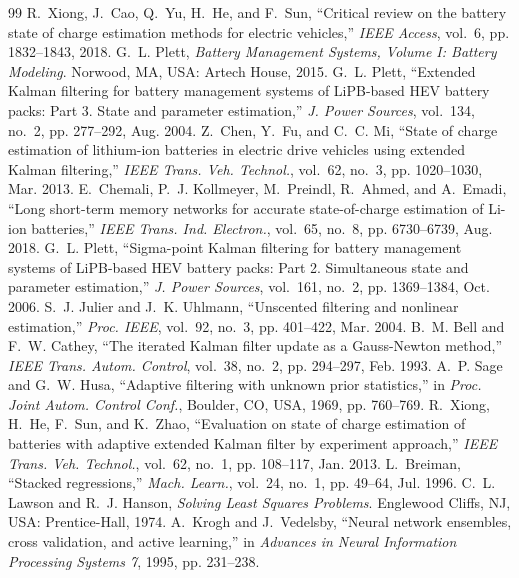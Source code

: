 \documentclass[journal]{IEEEtran}
\begin{document}
\begin{thebibliography}{99}
 R.~Xiong, J.~Cao, Q.~Yu, H.~He, and F.~Sun, ``Critical review on the battery state of charge estimation methods for electric vehicles,'' \emph{IEEE Access}, vol.~6, pp. 1832--1843, 2018.
 G.~L. Plett, \emph{Battery Management Systems, Volume I: Battery Modeling}. Norwood, MA, USA: Artech House, 2015.
 G.~L. Plett, ``Extended Kalman filtering for battery management systems of LiPB-based HEV battery packs: Part 3. State and parameter estimation,'' \emph{J. Power Sources}, vol.~134, no.~2, pp. 277--292, Aug. 2004.
 Z.~Chen, Y.~Fu, and C.~C. Mi, ``State of charge estimation of lithium-ion batteries in electric drive vehicles using extended Kalman filtering,'' \emph{IEEE Trans. Veh. Technol.}, vol.~62, no.~3, pp. 1020--1030, Mar. 2013.
 E.~Chemali, P.~J. Kollmeyer, M.~Preindl, R.~Ahmed, and A.~Emadi, ``Long short-term memory networks for accurate state-of-charge estimation of Li-ion batteries,'' \emph{IEEE Trans. Ind. Electron.}, vol.~65, no.~8, pp. 6730--6739, Aug. 2018.
 G.~L. Plett, ``Sigma-point Kalman filtering for battery management systems of LiPB-based HEV battery packs: Part 2. Simultaneous state and parameter estimation,'' \emph{J. Power Sources}, vol.~161, no.~2, pp. 1369--1384, Oct. 2006.
 S.~J. Julier and J.~K. Uhlmann, ``Unscented filtering and nonlinear estimation,'' \emph{Proc. IEEE}, vol.~92, no.~3, pp. 401--422, Mar. 2004.
 B.~M. Bell and F.~W. Cathey, ``The iterated Kalman filter update as a Gauss-Newton method,'' \emph{IEEE Trans. Autom. Control}, vol.~38, no.~2, pp. 294--297, Feb. 1993.
 A.~P. Sage and G.~W. Husa, ``Adaptive filtering with unknown prior statistics,'' in \emph{Proc. Joint Autom. Control Conf.}, Boulder, CO, USA, 1969, pp. 760--769.
 R.~Xiong, H.~He, F.~Sun, and K.~Zhao, ``Evaluation on state of charge estimation of batteries with adaptive extended Kalman filter by experiment approach,'' \emph{IEEE Trans. Veh. Technol.}, vol.~62, no.~1, pp. 108--117, Jan. 2013.
 L.~Breiman, ``Stacked regressions,'' \emph{Mach. Learn.}, vol.~24, no.~1, pp. 49--64, Jul. 1996.
 C.~L. Lawson and R.~J. Hanson, \emph{Solving Least Squares Problems}. Englewood Cliffs, NJ, USA: Prentice-Hall, 1974.
 A.~Krogh and J.~Vedelsby, ``Neural network ensembles, cross validation, and active learning,'' in \emph{Advances in Neural Information Processing Systems 7}, 1995, pp. 231--238.

\end{thebibliography}
\end{document}
